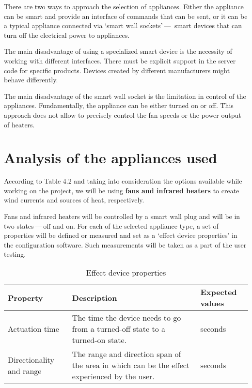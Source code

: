 There are two ways to approach the selection of appliances. Either the
appliance can be smart and provide an interface of commands that can be sent, or
it can be a typical appliance connected via `smart wall sockets' — 
smart devices that can turn off the electrical power to appliances.

The main disadvantage of using a specialized smart device is the necessity of
working with different interfaces. There must be explicit
support in the server code for specific products. Devices created by different
manufacturers might behave differently.

The main disadvantage of the smart wall socket is the limitation in
control of the appliances. Fundamentally, the appliance can be either turned on or off.
This approach does not allow to precisely control the fan speeds or the power output
of heaters.

\hypertarget{x-analysis-of-the-appliances-used}{\section{Analysis of the appliances used}}
According to Table 4.2 and taking into consideration the
options available while working on the project, we will be using \textbf{fans
and infrared heaters}
to create wind currents and sources of heat, respectively.

Fans and infrared heaters will be controlled by a smart wall plug
and will be in two states — off and on. For each of the selected appliance
type, a set of properties will be defined
or measured and set as a `effect device properties' in the configuration
software. Such measurements will be taken as a part of the user testing.

\begin{table}[H]
\centering
\begin{tabular}{|p{6em}|p{20em}|p{6em}|}
\hline
\textbf{Property}        & \textbf{Description}                                                                         & \textbf{Expected values} \\ \hline
Actuation time           & The time the device needs to go from a turned-off state to a turned-on state.                & seconds                  \\ \hline
Directionality and range & The range and direction span of the area in which can be the effect experienced by the user. & seconds                  \\ \hline
\end{tabular}
\caption{Effect device properties}
\end{table}

